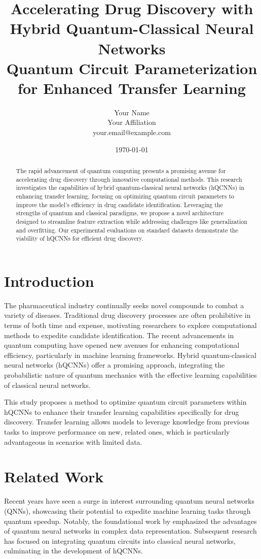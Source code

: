 \documentclass{article}
\title{Accelerating Drug Discovery with Hybrid Quantum-Classical Neural Networks\\
Quantum Circuit Parameterization for Enhanced Transfer Learning}
\author{Your Name \\ Your Affiliation \\ your.email@example.com}
\date{\today}
\begin{document}
\maketitle

\begin{abstract}
    The rapid advancement of quantum computing presents a promising avenue for accelerating drug discovery through innovative computational methods. This research investigates the capabilities of hybrid quantum-classical neural networks (hQCNNs) in enhancing transfer learning, focusing on optimizing quantum circuit parameters to improve the model's efficiency in drug candidate identification. Leveraging the strengths of quantum and classical paradigms, we propose a novel architecture designed to streamline feature extraction while addressing challenges like generalization and overfitting. Our experimental evaluations on standard datasets demonstrate the viability of hQCNNs for efficient drug discovery.
\end{abstract}

\section{Introduction}
The pharmaceutical industry continually seeks novel compounds to combat a variety of diseases. Traditional drug discovery processes are often prohibitive in terms of both time and expense, motivating researchers to explore computational methods to expedite candidate identification. The recent advancements in quantum computing have opened new avenues for enhancing computational efficiency, particularly in machine learning frameworks. Hybrid quantum-classical neural networks (hQCNNs) offer a promising approach, integrating the probabilistic nature of quantum mechanics with the effective learning capabilities of classical neural networks.

This study proposes a method to optimize quantum circuit parameters within hQCNNs to enhance their transfer learning capabilities specifically for drug discovery. Transfer learning allows models to leverage knowledge from previous tasks to improve performance on new, related ones, which is particularly advantageous in scenarios with limited data.

\section{Related Work}
Recent years have seen a surge in interest surrounding quantum neural networks (QNNs), showcasing their potential to expedite machine learning tasks through quantum speedup. Notably, the foundational work by \cite{Farhi2018} emphasized the advantages of quantum neural networks in complex data representation. Subsequent research has focused on integrating quantum circuits into classical neural networks, culminating in the development of hQCNNs. 
\end{document}
